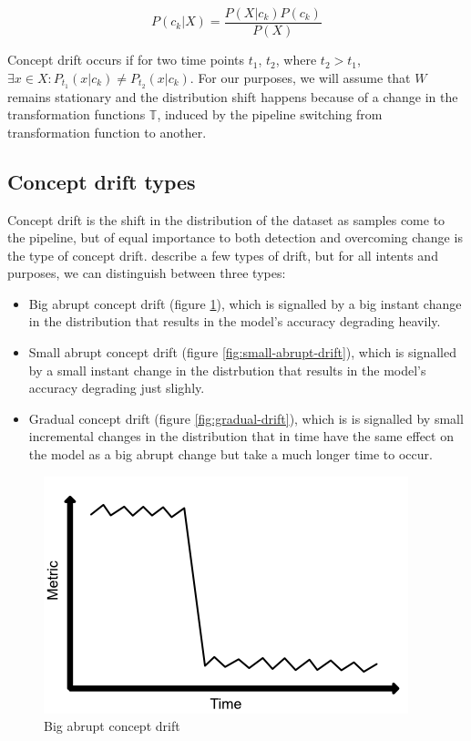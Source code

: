 \documentclass[12pt]{extreport}
\begin{document}
\begin{equation}
    P(c_k|X) = \frac{P(X|c_k) P(c_k)}{P(X)}
\end{equation}

Concept drift occurs if for two time points $t_1$, $t_2$, where $t_2 > t_1$, $\exists x \in X: P_{t_1}(x|c_k) \neq P_{t_2}(x|c_k)$. For our purposes, we will assume that $W$ remains stationary and the distribution shift happens because of a change in the transformation functions $\mathbb{T}$, induced by the pipeline switching from transformation function to another.

\subsection{Concept drift types}

Concept drift is the shift in the distribution of the dataset as samples come to the pipeline, but of equal importance to both detection and overcoming change is the type of concept drift. \cite{survey-concept-drift} describe a few types of drift, but for all intents and purposes, we can distinguish between three types:

\begin{itemize}
    \item Big abrupt concept drift (figure \ref{fig:big-abrupt-drift}), which is signalled by a big instant change in the distribution that results in the model's accuracy degrading heavily.
    \item Small abrupt concept drift (figure \ref{fig:small-abrupt-drift}), which is signalled by a small instant change in the distrbution that results in the model's accuracy degrading just slighly.
    \item Gradual concept drift (figure \ref{fig:gradual-drift}), which is is signalled by small incremental changes in the distribution that in time have the same effect on the model as a big abrupt change but take a much longer time to occur.
\end{itemize}

\begin{figure}[ht!]
\centering
\includegraphics[width=0.6\linewidth]{assets/preliminaries/big-abrupt-drift.png}
\caption{Big abrupt concept drift}
\label{fig:big-abrupt-drift}
\end{figure}
\end{document}
